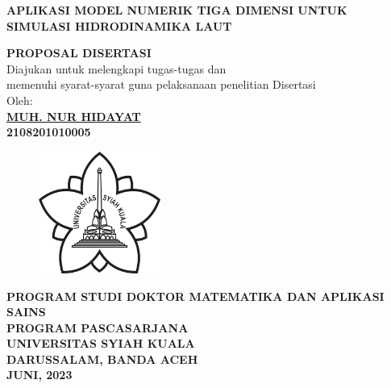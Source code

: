 \begin{spacing}{1}
	\begin{center}
		{\Large\textbf{APLIKASI MODEL NUMERIK TIGA DIMENSI UNTUK SIMULASI HIDRODINAMIKA LAUT}}\\[1.0cm]
	\end{center}
	\vspace*{0.8cm} 
	
	\begin{center}
		
		\large{\textbf{PROPOSAL DISERTASI}}
		\\\vspace*{1.8cm}    
		\normalsize{Diajukan untuk melengkapi tugas-tugas dan \\
			memenuhi syarat-syarat guna pelaksanaan penelitian Disertasi}\\[1.5cm]
		\vspace*{1cm}  
		{\large Oleh:}\\
		\vspace*{1cm}       
		\large{\textbf{\underline{MUH. NUR HIDAYAT}}}
		\\\large{\textbf{2108201010005}} 
	\end{center}\vspace*{1cm}   
	
	\begin{figure}[h]
		\centering
		\includegraphics[width=4cm]{contents/USK} %
	\end{figure}
	\vspace*{1.5cm}   
	
	\begin{center}
		\textbf{PROGRAM STUDI DOKTOR MATEMATIKA DAN APLIKASI SAINS\\
			PROGRAM PASCASARJANA \\
			UNIVERSITAS SYIAH KUALA\\
			DARUSSALAM, BANDA ACEH\\
			JUNI, 2023}
	\end{center}
	\thispagestyle{empty}
\end{spacing}